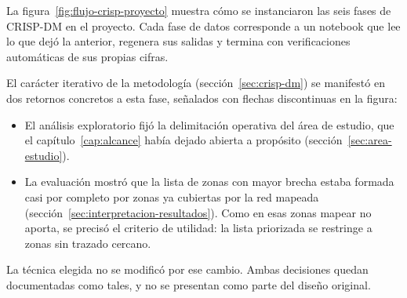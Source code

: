 La figura~\ref{fig:flujo-crisp-proyecto} muestra cómo se instanciaron las seis fases de
CRISP-DM en el proyecto. Cada fase de datos corresponde a un notebook que lee lo que dejó
la anterior, regenera sus salidas y termina con verificaciones automáticas de sus propias
cifras.

El carácter iterativo de la metodología (sección~\ref{sec:crisp-dm}) se manifestó en dos
retornos concretos a esta fase, señalados con flechas discontinuas en la figura:
\begin{itemize}
  \item El análisis exploratorio fijó la delimitación operativa del área de estudio, que
        el capítulo~\ref{cap:alcance} había dejado abierta a propósito
        (sección~\ref{sec:area-estudio}).
  \item La evaluación mostró que la lista de zonas con mayor brecha estaba formada casi por
        completo por zonas ya cubiertas por la red mapeada
        (sección~\ref{sec:interpretacion-resultados}). Como en esas zonas mapear no aporta,
        se precisó el criterio de utilidad: la lista priorizada se restringe a zonas sin
        trazado cercano.
\end{itemize}
La técnica elegida no se modificó por ese cambio. Ambas decisiones quedan documentadas
como tales, y no se presentan como parte del diseño original.

